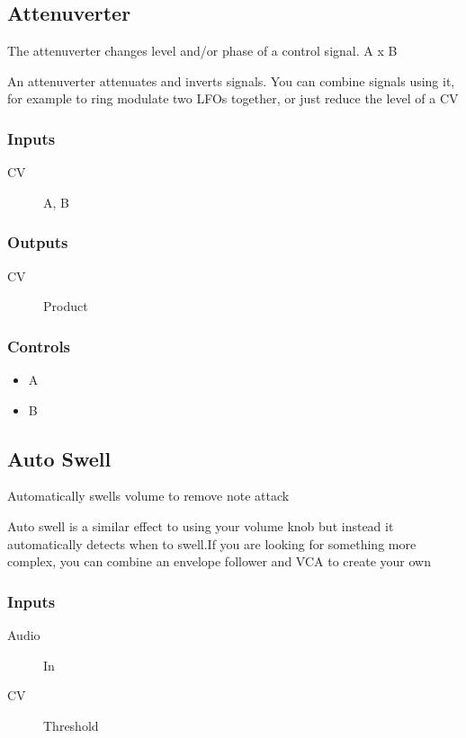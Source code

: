 \subsection{Attenuverter}

The attenuverter changes level and/or phase of a control signal. A x B

An attenuverter attenuates and inverts signals.
                  You can combine signals using it, for example to ring modulate two LFOs together, or just reduce the level of a CV

\subsubsection{Inputs}
\begin{description}
\item [CV] A, B
\end{description}

\subsubsection{Outputs}
\begin{description}
\item [CV] Product
\end{description}

\subsubsection{Controls}
\begin{itemize}
\item A
\item B
\end{itemize}

\subsection{Auto Swell}

Automatically swells volume to remove note attack

Auto swell is a similar effect to using your volume knob but instead it automatically detects when to swell.If you are looking for something more complex, you can combine an envelope follower and VCA to create your own

\subsubsection{Inputs}
\begin{description}
\item [Audio] In
\item [CV] Threshold
\end{description}

